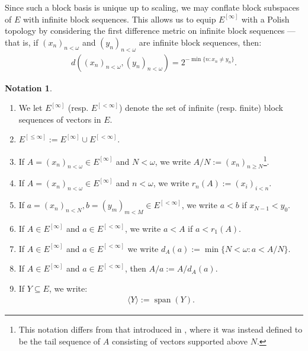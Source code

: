 \documentclass[11pt,reqno]{amsart}
\theoremstyle{plain}
\numberwithin{equation}{section}
\theoremstyle{definition}
\newtheorem{notation}[theorem]{Notation}
\newcommand{\func}{\operatorname}
\renewcommand{\c}[1]{\langle #1 \rangle}
\begin{document}
Since such a block basis is unique up to scaling, we may conflate block subspaces of $E$ with infinite block sequences. This allows us to equip $E^{[\infty]}$ with a Polish topology by considering the first difference metric on infinite block sequences --- that is, if $(x_n)_{n<\omega}$ and $(y_n)_{n<\omega}$ are infinite block sequences, then:
\begin{align*}
    d((x_n)_{n<\omega},(y_n)_{n<\omega}) = 2^{-\min\{n : x_n \neq y_n\}}.
\end{align*}

\begin{notation}
\label{not:notations}
\hfill
    \begin{enumerate}
        \item We let $E^{[\infty]}$ (resp. $E^{[<\infty]}$) denote the set of infinite (resp. finite) block sequences of vectors in $E$. 

        \item $E^{[\leq\infty]} := E^{[\infty]} \cup E^{[<\infty]}$.

        \item If $A = (x_n)_{n<\omega} \in E^{[\infty]}$ and $N < \omega$, we write $A/N := (x_n)_{n \geq N}$\footnote{This notation differs from that introduced in \cite{S23}, where it was instead defined to be the tail sequence of $A$ consisting of vectors supported above $N$.}.
        
        \item If $A = (x_n)_{n<\omega} \in E^{[\infty]}$ and $n < \omega$, we write $r_n(A) := (x_i)_{i<n}$.
        
        \item If $a = (x_n)_{n<N},b = (y_m)_{m<M} \in E^{[<\infty]}$, we write $a < b$ if $x_{N-1} < y_0$.
        
        \item If $A \in E^{[\infty]}$ and $a \in E^{[<\infty]}$, we write $a < A$ if $a < r_1(A)$.
        
        \item If $A \in E^{[\infty]}$ and $a \in E^{[<\infty]}$ we write $d_A(a) := \min\{N < \omega : a < A/N\}$.

        \item If $A \in E^{[\infty]}$ and $a \in E^{[<\infty]}$, then $A/a := A/d_A(a)$.
        
        \item If $Y \subseteq E$, we write:
        \begin{align*}
            \c{Y} := \func{span}(Y).
        \end{align*}


\end{enumerate}
\end{notation}
\end{document}
